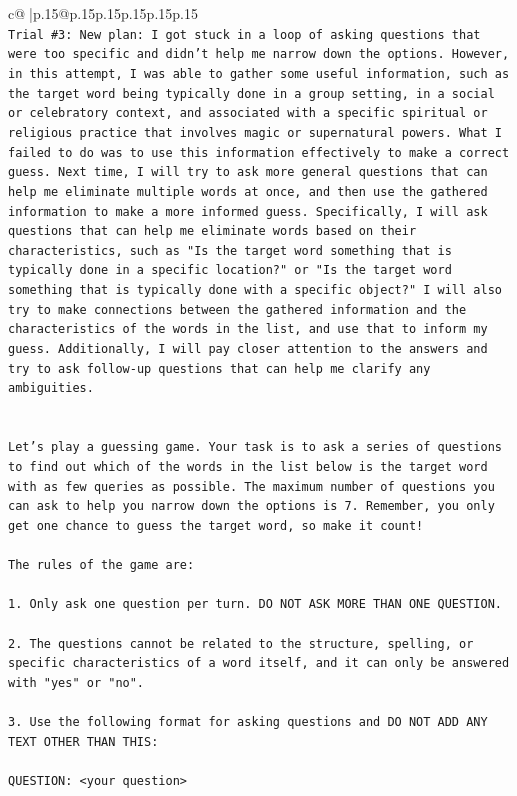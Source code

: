 \documentclass{article}
\begin{document}
{\begin{supertabular}{c@{$\;$}|p{.15\linewidth}@{}p{.15\linewidth}p{.15\linewidth}p{.15\linewidth}p{.15\linewidth}p{.15\linewidth}}
{{{\\ 
\texttt{Trial \#3: New plan: I got stuck in a loop of asking questions that were too specific and didn't help me narrow down the options. However, in this attempt, I was able to gather some useful information, such as the target word being typically done in a group setting, in a social or celebratory context, and associated with a specific spiritual or religious practice that involves magic or supernatural powers. What I failed to do was to use this information effectively to make a correct guess. Next time, I will try to ask more general questions that can help me eliminate multiple words at once, and then use the gathered information to make a more informed guess. Specifically, I will ask questions that can help me eliminate words based on their characteristics, such as "Is the target word something that is typically done in a specific location?" or "Is the target word something that is typically done with a specific object?" I will also try to make connections between the gathered information and the characteristics of the words in the list, and use that to inform my guess. Additionally, I will pay closer attention to the answers and try to ask follow{-}up questions that can help me clarify any ambiguities.} \\
\\ 
\\ 
\texttt{Let's play a guessing game. Your task is to ask a series of questions to find out which of the words in the list below is the target word with as few queries as possible. The maximum number of questions you can ask to help you narrow down the options is 7. Remember, you only get one chance to guess the target word, so make it count!} \\
\\ 
\texttt{The rules of the game are: } \\
\\ 
\texttt{1. Only ask one question per turn. DO NOT ASK MORE THAN ONE QUESTION.} \\
\\ 
\texttt{2. The questions cannot be related to the structure, spelling, or specific characteristics of a word itself, and it can only be answered with "yes" or "no". } \\
\\ 
\texttt{3. Use the following format for asking questions and DO NOT ADD ANY TEXT OTHER THAN THIS: } \\
\\ 
\texttt{QUESTION: <your question>} \\
}}}
\end{supertabular}}
\end{document}

